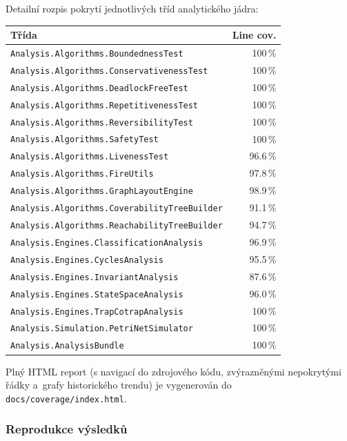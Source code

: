 \documentclass[12pt,a4paper]{article}
\begin{document}
Detailní rozpis pokrytí jednotlivých tříd analytického jádra:

\begin{longtable}{@{}p{8.5cm}r@{}}
    \toprule
    \textbf{Třída} & \textbf{Line cov.} \\
    \midrule
    \endhead
    \texttt{Analysis.Algorithms.BoundednessTest}        & 100\,\% \\
    \texttt{Analysis.Algorithms.ConservativenessTest}   & 100\,\% \\
    \texttt{Analysis.Algorithms.DeadlockFreeTest}       & 100\,\% \\
    \texttt{Analysis.Algorithms.RepetitivenessTest}     & 100\,\% \\
    \texttt{Analysis.Algorithms.ReversibilityTest}      & 100\,\% \\
    \texttt{Analysis.Algorithms.SafetyTest}             & 100\,\% \\
    \texttt{Analysis.Algorithms.LivenessTest}           &  96.6\,\% \\
    \texttt{Analysis.Algorithms.FireUtils}              &  97.8\,\% \\
    \texttt{Analysis.Algorithms.GraphLayoutEngine}      &  98.9\,\% \\
    \texttt{Analysis.Algorithms.CoverabilityTreeBuilder}&  91.1\,\% \\
    \texttt{Analysis.Algorithms.ReachabilityTreeBuilder}&  94.7\,\% \\
    \texttt{Analysis.Engines.ClassificationAnalysis}    &  96.9\,\% \\
    \texttt{Analysis.Engines.CyclesAnalysis}            &  95.5\,\% \\
    \texttt{Analysis.Engines.InvariantAnalysis}         &  87.6\,\% \\
    \texttt{Analysis.Engines.StateSpaceAnalysis}        &  96.0\,\% \\
    \texttt{Analysis.Engines.TrapCotrapAnalysis}        & 100\,\% \\
    \texttt{Analysis.Simulation.PetriNetSimulator}      & 100\,\% \\
    \texttt{Analysis.AnalysisBundle}                    & 100\,\% \\
    \bottomrule
\end{longtable}

Plný HTML report (s navigací do zdrojového kódu, zvýrazněnými
nepokrytými řádky a~grafy historického trendu) je vygenerován do
\texttt{docs/coverage/index.html}.

\subsubsection{Reprodukce výsledků}
\end{document}

